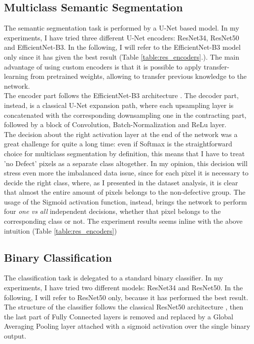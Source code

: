 \documentclass[10pt,twocolumn,letterpaper]{article}
\begin{document}
   \subsection{Multiclass Semantic Segmentation}
   The semantic segmentation task is performed by a U-Net based model. In my experiments, I have tried three different U-Net encoders: ResNet34, ResNet50 and EfficientNet-B3. In the following, I will refer to the EfficientNet-B3 model only since it has given the best result (Table \ref{table:res_encoders}.).
   The main advantage of using custom encoders is that it is possible to apply transfer-learning from pretrained weights, allowing to transfer previous knowledge to the network. \\
   The encoder part follows the EfficientNet-B3 architecture \cite{efficientnet}. The decoder part, instead, is a classical U-Net expansion path, where each upsampling layer is concatenated with the corresponding downsampling one in the contracting part, followed by a block of Convolution, Batch-Normalization and ReLu layer. \\
   The decision about the right activation layer at the end of the network was a great challenge for quite a long time: even if Softmax is the straightforward choice for multiclass segmentation by definition, this means that I have to treat 'no Defect' pixels as a separate class altogether. In my opinion, this decision will stress even more the imbalanced data issue, since for each pixel it is necessary to decide the right class, where, as I presented in the dataset analysis, it is clear that almost the entire amount of pixels belongs to the non-defective group. The usage of the Sigmoid activation function, instead, brings the network to perform four \textit{one vs all} independent decisions, whether that pixel belongs to the corresponding class or not. The experiment results seems inline with the above intuition (Table \ref{table:res_encoders})

   \subsection{Binary Classification}
   The classification task is delegated to a standard binary classifier. In my experiments, I have tried two different models: ResNet34 and ResNet50. In the following, I will refer to ResNet50 only, because it has performed the best result.
   The structure of the classifier follows the classical ResNet50 architecture \cite{resnet}, then the last part of Fully Connected layers is removed and replaced by a Global Averaging Pooling layer attached with a sigmoid activation over the single binary output.
\end{document}
